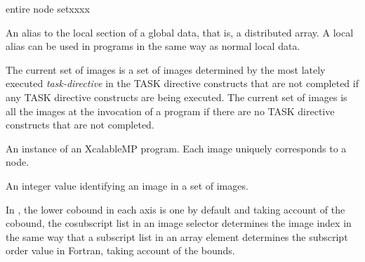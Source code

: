 \begin{namelist}{entire node setxxxx}


 An alias to the local section of a global data, that is, a distributed
 array. A local alias can be used in {\XMP} programs in the same way as
 normal local data.

%
%

 The current set of images is a set of images determined by the most
 lately executed {\itshape task-directive} in the TASK directive
 constructs that are not completed if any TASK directive constructs are
 being executed. The current set of images is all the images
 at the invocation of a program
 if there are no TASK directive constructs that are not completed.


An instance of an XcalableMP program.
Each image uniquely corresponds to a node.


An integer value identifying an image in a set of images.

In {\XMPC}, the lower cobound in each axis is one by default and
taking account of the cobound,
the cosubscript list in an image selector determines the
image index in the same way that a subscript list in an array element
determines the subscript order value in Fortran,
taking account of the bounds.

\end{namelist}
